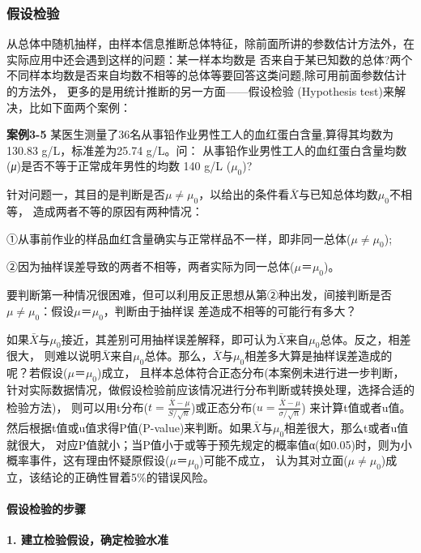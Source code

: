 \documentclass[
]{article}
\begin{document}
\hypertarget{ux5047ux8bbeux68c0ux9a8c}{%
\subsubsection{假设检验}\label{ux5047ux8bbeux68c0ux9a8c}}

从总体中随机抽样，由样本信息推断总体特征，除前面所讲的参数估计方法外，在实际应用中还会遇到这样的问题：某一样本均数是
否来自于某已知数的总体?两个不同样本均数是否来自均数不相等的总体等要回答这类问题,除可用前面参数估计的方法外，
更多的是用统计推断的另一方面------假设检验 (Hypothesis test)来解决，比如下面两个案例：

\textbf{案例3-5} 某医生测量了36名从事铅作业男性工人的血红蛋白含量,算得其均数为130.83 g/L，标准差为25.74 g/L。问：
从事铅作业男性工人的血红蛋白含量均数(\emph{μ})是否不等于正常成年男性的均数 140 g/L (\(μ_0\))?

针对问题一，其目的是判断是否\(μ≠μ_0\)，以给出的条件看\(\bar{X}\)与已知总体均数\(μ_0\)不相等，
造成两者不等的原因有两种情况：

①从事前作业的样品血红含量确实与正常样品不一样，即非同一总体(\(μ≠μ_0\));

②因为抽样误差导致的两者不相等，两者实际为同一总体(\(μ＝μ_0\))。

要判断第一种情况很困难，但可以利用反正思想从第②种出发，间接判断是否\(μ≠μ_0\)：假设\(μ＝μ_0\)，判断由于抽样误
差造成不相等的可能行有多大？

如果\(\bar{X}\)与\(μ_0\)接近，其差别可用抽样误差解释，即可认为\(\bar{X}\)来自\(μ_0\)总体。反之，相差很大，
则难以说明\(\bar{X}\)来自\(μ_0\)总体。那么，\(\bar{X}\)与\(μ_0\)相差多大算是抽样误差造成的呢？若假设(\(μ＝μ_0\))成立，
且样本总体符合正态分布(本案例未进行进一步判断，针对实际数据情况，做假设检验前应该情况进行分布判断或转换处理，选择合适的检验方法)，
则可以用t分布(\(t=\frac{\bar{X}-μ}{S/\sqrt{n}}\))或正态分布(\(u=\frac{\bar{X}-μ}{\sigma/\sqrt{n}}\))
来计算t值或者u值。然后根据t值或u值求得P值(P-value)来判断。如果\(\bar{X}\)与\(μ_0\)相差很大，那么t或者u值就很大，
对应P值就小；当P值小于或等于预先规定的概率值α(如0.05)时，则为小概率事件，这有理由怀疑原假设(\(μ＝μ_0\))可能不成立，
认为其对立面(\(μ≠μ_0\))成立，该结论的正确性冒着5\%的错误风险。

\hypertarget{ux5047ux8bbeux68c0ux9a8cux7684ux6b65ux9aa4}{%
\paragraph{假设检验的步骤}\label{ux5047ux8bbeux68c0ux9a8cux7684ux6b65ux9aa4}}

\textbf{1. 建立检验假设，确定检验水准}
\end{document}
